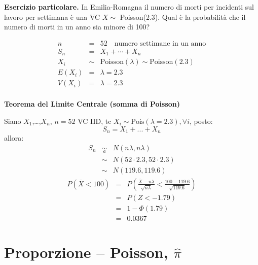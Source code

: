 \documentclass[
  11pt,
]{book}
\theoremstyle{mytheoremstyle}
\theoremstyle{mydefstyle}
\newenvironment{sol}
  {
  \begin{tcolorbox}[enhanced,breakable,arc=0.1mm,boxrule=1pt,colback=white,colframe=iblue,
  title=\bf \fontfamily{lmss}\selectfont \hspace{.5 cm} Soluzione,drop fuzzy shadow]

}{
\end{tcolorbox}
  }
\begin{document}
\textbf{Esercizio particolare.} In Emilia-Romagna il numero di morti per
incidenti sul lavoro per settimana è una VC \(X \sim\) Poisson(2.3). Qual
è la probabilità che il numero di morti in un anno sia minore di 100?

\begin{sol}
\begin{eqnarray*}
n           &=& 52 \quad\mbox{numero settimane in un anno}          \\
S_{n}       &=& X_{1} + \cdots + X_{n}                              \\
X_{i}    &\sim& \mbox{Poisson}(\lambda) \sim\mbox{Poisson}(2.3)       \\
E(X_{i})    &=& \lambda = 2.3                                       \\
V(X_{i})    &=& \lambda = 2.3                                       \\
\end{eqnarray*}

\textbf{Teorema del Limite Centrale (somma di Poisson)}

Siano \(X_1\),\ldots,\(X_n\), \(n=52\) VC IID, tc \(X_i\sim\text{Pois}(\lambda=2.3)\)\(,\forall i\), posto:
\[
      S_n = X_1 + ... + X_n
      \]
allora:\begin{eqnarray*}
  S_n & \mathop{\sim}\limits_{a}& N(n\lambda,n\lambda) \\
  &\sim & N(52\cdot2.3,52\cdot2.3) \\
     &\sim & N(119.6,119.6) 
  \end{eqnarray*}\begin{eqnarray*}
      P( \bar X   <   100 ) 
        &=& P\left(  \frac { \bar X  -  n\lambda }{ \sqrt{n\lambda} }  <  \frac { 100  -  119.6 }{\sqrt{ 119.6 }} \right)  \\
                 &=& P\left(  Z   <   -1.79 \right) \\    
                 &=&  1-\Phi( 1.79 ) \\ &=&  0.0367 
      \end{eqnarray*}

\end{sol}

\section{\texorpdfstring{Proporzione -- Poisson, \(\widehat{\pi}\)}{Proporzione -- Poisson, \textbackslash widehat\{\textbackslash pi\}}}\label{proporzione-poisson-widehatpi}
\end{document}
